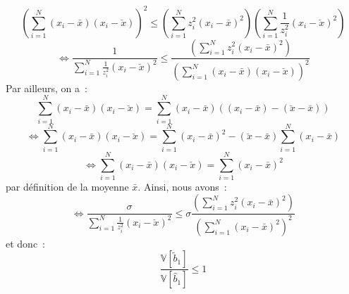 \documentclass[12pt,a4paper,notitlepage]{article}
\newcounter{qnumber}
\begin{document}
\[
\left(\sum_{i=1}^N (x_i-\bar x)(x_i-\breve x)\right)^2 \leq \left(\sum_{i=1}^Nz_i^2(x_i-\bar x)^2 \right)\left(\sum_{i=1}^N\frac{1}{z_i^2}(x_i-\breve x)^2 \right) 
\]
\[
\Leftrightarrow \frac{1}{\sum_{i=1}^N\frac{1}{z_i^2}(x_i-\breve x)^2} \leq \frac{\left(\sum_{i=1}^Nz_i^2(x_i-\bar x)^2 \right)}{\left(\sum_{i=1}^N (x_i-\bar x)(x_i-\breve x)\right)^2}
\]
Par ailleurs, on a~:
\[
  \sum_{i=1}^N (x_i-\bar x)(x_i-\breve x) = \sum_{i=1}^N (x_i-\bar x)\left((x_i-\bar x) - (\breve x - \bar x)  \right)
\]
\[
  \Leftrightarrow \sum_{i=1}^N (x_i-\bar x)(x_i-\breve x) = \sum_{i=1}^N (x_i-\bar x)^2- (\breve x - \bar x)\sum_{i=1}^N (x_i-\bar x)
\]
\[
  \Leftrightarrow \sum_{i=1}^N (x_i-\bar x)(x_i-\breve x) = \sum_{i=1}^N (x_i-\bar x)^2
\]
par définition de la moyenne $\bar x$. Ainsi, nous avons~:
\[
\Leftrightarrow \frac{\sigma}{\sum_{i=1}^N\frac{1}{z_i^2}(x_i-\breve x)^2} \leq \sigma\frac{\left(\sum_{i=1}^Nz_i^2(x_i-\bar x)^2 \right)}{\left(\sum_{i=1}^N (x_i-\bar x)^2\right)^2}
\]
et donc~:
\[
\frac{\mathbb V\left[\tilde b_1\right]}{\mathbb V\left[\hat b_1\right]} \leq 1
\]

\setcounter{qnumber}{0}
\bigskip
\end{document}
